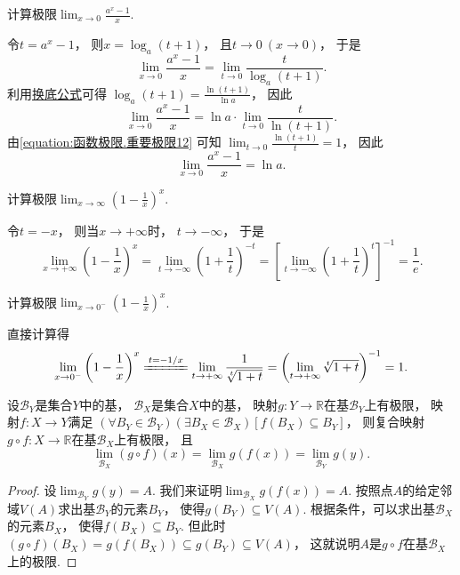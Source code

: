 \begin{example}
计算极限\(\lim_{x\to0} \frac{a^x-1}{x}\).
\begin{solution}
令\(t=a^x-1\)，
则\(x=\log_a(t+1)\)，
且\(t\to0\ (x\to0)\)，
于是\[
	\lim_{x\to0} \frac{a^x-1}{x}
	= \lim_{t\to0} \frac{t}{\log_a(t+1)}.
\]
利用\hyperref[equation:函数.换底公式]{换底公式}可得
\(\log_a(t+1) = \frac{\ln(t+1)}{\ln a}\)，
因此\[
	\lim_{x\to0} \frac{a^x-1}{x}
	= \ln a \cdot \lim_{t\to0} \frac{t}{\ln(t+1)}.
\]
由\cref{equation:函数极限.重要极限12} 可知
\(\lim_{t\to0} \frac{\ln(t+1)}{t} = 1\)，
因此\begin{equation}\label{equation:函数极限.重要极限17}
	\lim_{x\to0} \frac{a^x-1}{x} = \ln a.
\end{equation}
\end{solution}
\end{example}

\begin{example}
计算极限\(\lim_{x\to\infty} \left(1-\frac1x\right)^x\).
\begin{solution}
令\(t = -x\)，
则当\(x \to +\infty\)时，
\(t \to -\infty\)，
于是\[
	\lim_{x\to+\infty} \left(1-\frac1x\right)^x
	= \lim_{t\to-\infty} \left(1+\frac1t\right)^{-t}
	= \left[\lim_{t\to-\infty} \left(1+\frac1t\right)^t\right]^{-1}
	= \frac1e.
\]
\end{solution}
\end{example}

\begin{example}
计算极限\(\lim_{x\to0^-} \left(1-\frac1x\right)^x\).
\begin{solution}
直接计算得\[
	\lim_{x\to0^-} \left(1-\frac1x\right)^x
	\xlongequal{t=-1/x} \lim_{t\to+\infty} \frac{1}{\sqrt[t]{1+t}}
	= \left(\lim_{t\to+\infty} \sqrt[t]{1+t}\right)^{-1}
	= 1.
\]
\end{solution}
\end{example}

\begin{theorem}
设\(\mathcal{B}_Y\)是集合\(Y\)中的基，
\(\mathcal{B}_X\)是集合\(X\)中的基，
映射\(g\colon Y\to\mathbb{R}\)在基\(\mathcal{B}_Y\)上有极限，
映射\(f\colon X\to Y\)满足
\((\forall B_Y\in\mathcal{B}_Y)
(\exists B_X\in\mathcal{B}_X)
[f(B_X) \subseteq B_Y]\)，
则复合映射\(g \circ f\colon X\to\mathbb{R}\)在基\(\mathcal{B}_X\)上有极限，
且\[
	\lim_{\mathcal{B}_X} (g \circ f)(x)
	= \lim_{\mathcal{B}_X} g(f(x))
	= \lim_{\mathcal{B}_Y} g(y).
\]
\begin{proof}
设\(\lim_{\mathcal{B}_Y} g(y) = A\).
我们来证明\(\lim_{\mathcal{B}_X} g(f(x)) = A\).
按照点\(A\)的给定邻域\(V(A)\)求出基\(\mathcal{B}_Y\)的元素\(B_Y\)，
使得\(g(B_Y) \subseteq V(A)\).
根据条件，可以求出基\(\mathcal{B}_X\)的元素\(B_X\)，
使得\(f(B_X) \subseteq B_Y\).
但此时\((g \circ f)(B_X) = g(f(B_X)) \subseteq g(B_Y) \subseteq V(A)\)，
这就说明\(A\)是\(g \circ f\)在基\(\mathcal{B}_X\)上的极限.
\end{proof}
\end{theorem}
